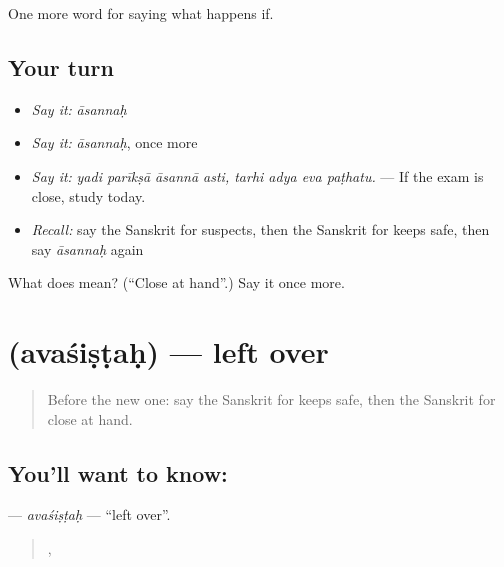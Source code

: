 \begin{grammarlens}[title={What you've built}]
One more word for saying what happens if.
\end{grammarlens}

\subsection*{Your turn}
\begin{itemize}
\raggedright
  \item \emph{Say it:} \emph{āsannaḥ}
  \item \emph{Say it:} \emph{āsannaḥ}, once more
  \item \emph{Say it:} \emph{yadi parīkṣā āsannā asti, tarhi adya eva paṭhatu.} — If the exam is close, study today.
  \item \emph{Recall:} say the Sanskrit for suspects, then the Sanskrit for keeps safe, then say \emph{āsannaḥ} again
\end{itemize}

\begin{tcolorbox}[breakable,colback=teal!4,colframe=teal!35!black,title={Before you move on}]
What does  mean? (\textquotedblleft{}Close at hand\textquotedblright{}.) Say it once more.
\end{tcolorbox}
\section[\texorpdfstring{\sk{अवशिष्टः} (avaśiṣṭaḥ)}{अवशिष्टः (avaśiṣṭaḥ)}]{ (avaśiṣṭaḥ) — left over}

\label{lesson:SA-C540-avasistah}



\begin{quote}
Before the new one: say the Sanskrit for keeps safe, then the Sanskrit for close at hand.
\end{quote}

\subsection*{You'll want to know: }
\textbf{} — \emph{avaśiṣṭaḥ} — \textquotedblleft{}left over\textquotedblright{}.

\begin{quote}
    ,   
\end{quote}

